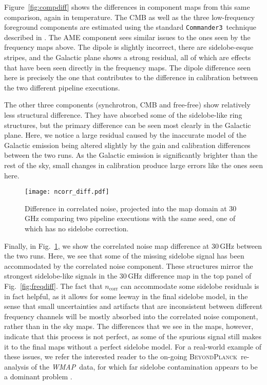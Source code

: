 \documentclass[twocolumn]{aa}
\def\WMAP{\textit{WMAP}}
\def\commanderthree{\texttt{Commander3}}
\newcommand{\BP}{\textsc{BeyondPlanck}}
\begin{document}
Figure~\ref{fig:compdiff} shows the differences in component maps from this same comparison, again in temperature. The CMB as well as the three low-frequency foreground components are estimated using the standard \commanderthree\ technique described in \cite{bp13}. The AME component sees similar issues to the ones seen by the frequency maps above. The dipole is slightly incorrect, there are sidelobe-esque stripes, and the Galactic plane shows a strong residual, all of which are effects that have been seen directly in the frequency maps. The dipole difference seen here is precisely the one that contributes to the difference in calibration between the two different pipeline executions. 

The other three components (synchrotron, CMB and free-free) show relatively less structural difference. They have absorbed some of the sidelobe-like ring structures, but the primary difference can be seen most clearly in the Galactic plane. Here, we notice a large residual caused by the inaccurate model of the Galactic emission being altered slightly by the gain and calibration differences between the two runs. As the Galactic emission is significantly brighter than the rest of the sky, small changes in calibration produce large errors like the ones seen here.

\begin{figure}[t]
  \center
  \texttt{[image: ncorr\_diff.pdf]}\\
  \caption{Difference in correlated noise, projected into the map domain at 30\,GHz comparing two pipeline executions with the same seed, one of which has no sidelobe correction.
  }\label{fig:ncorr}
\end{figure}

Finally, in Fig.~\ref{fig:ncorr}, we show the correlated noise map difference at 30\,GHz between the two runs. Here, we see that some of the missing sidelobe signal has been accommodated by the correlated noise component. These structures mirror the strongest sidelobe-like signals in the 30\,GHz difference map in the top panel of Fig.~\ref{fig:freqdiff}. The fact that $n_{\mathrm{corr}}$ can accommodate some sidelobe residuals is in fact helpful, as it allows for some leeway in the final sidelobe model, in the sense that small uncertainties and artifacts that are inconsistent between different frequency channels will be mostly absorbed into the correlated noise component, rather than in the sky maps. The differences that we see in the maps, however, indicate that this process is not perfect, as some of the spurious signal still makes it to the final maps without a perfect sidelobe model. For a real-world example of these issues, we refer the interested reader to the on-going \BP\ re-analysis of the \WMAP\ data, for which far sidelobe contamination appears to be a dominant problem \citep{bp17}.
\end{document}
